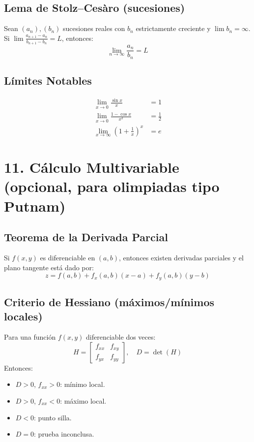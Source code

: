 \documentclass[12pt]{article}
\begin{document}
\subsection{Lema de Stolz–Cesàro (sucesiones)}
Sean $(a_n), (b_n)$ sucesiones reales con $b_n$ estrictamente creciente y $\lim b_n = \infty$. Si $\lim \frac{a_{n+1} - a_n}{b_{n+1} - b_n} = L$, entonces:
\[
\lim_{n \to \infty} \frac{a_n}{b_n} = L
\]

\subsection{Límites Notables}
\begin{align*}
\lim_{x \to 0} \frac{\sin x}{x} &= 1 \\
\lim_{x \to 0} \frac{1 - \cos x}{x^2} &= \frac{1}{2} \\
\lim_{x \to \infty} \left(1 + \frac{1}{x}\right)^x &= e
\end{align*}

\section{11. Cálculo Multivariable (opcional, para olimpiadas tipo Putnam)}

\subsection{Teorema de la Derivada Parcial}
Si $f(x,y)$ es diferenciable en $(a,b)$, entonces existen derivadas parciales y el plano tangente está dado por:
\[
z = f(a,b) + f_x(a,b)(x - a) + f_y(a,b)(y - b)
\]

\subsection{Criterio de Hessiano (máximos/mínimos locales)}
Para una función $f(x,y)$ diferenciable dos veces:
\[
H = 
\begin{bmatrix}
f_{xx} & f_{xy} \\
f_{yx} & f_{yy}
\end{bmatrix},\quad D = \det(H)
\]
Entonces:
\begin{itemize}
  \item $D > 0$, $f_{xx} > 0$: mínimo local.
  \item $D > 0$, $f_{xx} < 0$: máximo local.
  \item $D < 0$: punto silla.
  \item $D = 0$: prueba inconclusa.
\end{itemize}
\end{document}
